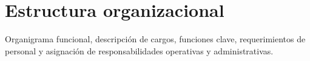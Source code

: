 \section{Estructura organizacional}
\label{sec:estructura_organizacional}

Organigrama funcional, descripción de cargos, funciones clave, requerimientos de personal y asignación de responsabilidades operativas y administrativas.

